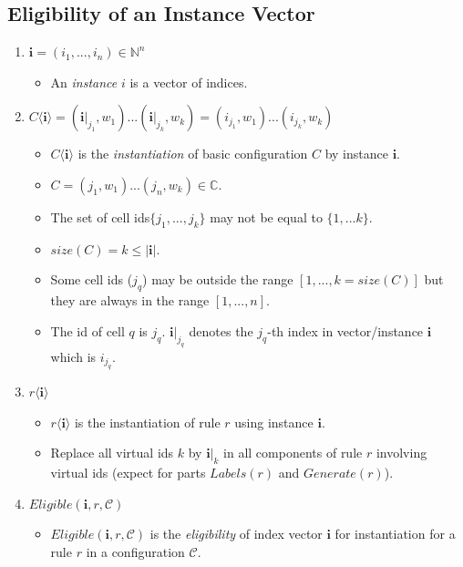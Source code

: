 \documentclass{article}
\begin{document}
\begin{appendices}

\subsection{Eligibility of an Instance Vector} \label{a-ff2-eligible}
\begin{enumerate}
   \item $\bm{i} = (i_1,...,i_n) \in \mathbb{N}^n$ 
         \begin{itemize}
         \item An \textit{instance} $i$ is a vector of indices.
         \end{itemize}
   \item $C\langle \bm{i} \rangle = (\bm{i}|_{j_1}, w_1)...(\bm{i}|_{j_k}, w_k) = (i_{j_1},w_1)...(i_{j_k},w_k)$
         \begin{itemize}
         \item $C\langle \bm{i} \rangle$ is the \textit{instantiation} of basic configuration $C$ by instance $\bm{i}$.
         \item $C = (j_1,w_1)...(j_n,w_k) \in \mathbb{C}$.
         \item The set of cell ids$ \{j_1,...,j_k\}$ may not be equal to $\{1,...k\}$.
         \item $size(C) = k \leq |\bm{i}|$.
         \item Some cell ids ($j_q$) may be outside the range $[1,...,k = size(C)]$ but they are always in the range $[1,...,n]$.
         \item The id of cell $q$ is $j_q$. $\bm{i}|_{j_q}$ denotes the $j_q$-th index in vector/instance $\bm{i}$ which is $i_{j_q}$.
         \end{itemize}
   \item $r\langle \bm{i} \rangle$
         \begin{itemize}
         \item $r\langle \bm{i} \rangle$ is the instantiation of rule $r$ using instance $\bm{i}$.
         \item Replace all virtual ids $k$ by $\bm{i}|_k$ in all components of rule $r$ involving virtual ids (expect for parts $Labels(r)$ and $Generate(r)$).
         \end{itemize}
   \item $Eligible(\bm{i}, r, \mathcal{C})$ 
         \begin{itemize}
         \item $Eligible(\bm{i}, r, \mathcal{C})$ is the \textit{eligibility} of index vector $\bm{i}$ for instantiation for a rule $r$ in a configuration $\mathcal{C}$.

\end{itemize}
\end{enumerate}
\end{appendices}
\end{document}
